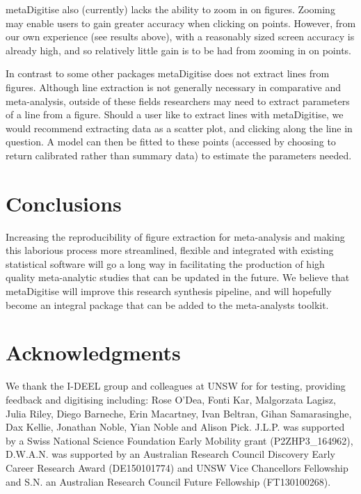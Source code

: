 \documentclass[12pt]{article}
\newcommand{\pkg}[1]{{\fontseries{b}\selectfont #1}}
\begin{document}
\pkg{metaDigitise} also (currently) lacks the ability to zoom in on figures. Zooming may enable users to gain greater accuracy when clicking on points. However, from our own experience (see results above), with a reasonably sized screen accuracy is already high, and so relatively little gain is to be had from zooming in on points.

In contrast to some other packages \pkg{metaDigitise} does not extract lines from figures. Although line extraction is not generally necessary in comparative and meta-analysis, outside of these fields researchers may need to extract parameters of a line from a figure. Should a user like to extract lines with \pkg{metaDigitise}, we would recommend extracting data as a scatter plot, and clicking along the line in question. A model can then be fitted to these points (accessed by choosing to return calibrated rather than summary data) to estimate the parameters needed.





\section{Conclusions}
Increasing the reproducibility of figure extraction for meta-analysis and making this laborious process more streamlined, flexible and integrated with existing statistical software will go a long way in facilitating the production of high quality meta-analytic studies that can be updated in the future. We believe that \pkg{metaDigitise} will improve this research synthesis pipeline, and will hopefully become an integral package that can be added to the meta-analysts toolkit.

\section*{Acknowledgments}
We thank the I-DEEL group and colleagues at UNSW for for testing, providing feedback and digitising including: Rose O'Dea, Fonti Kar, Malgorzata Lagisz, Julia Riley, Diego Barneche, Erin Macartney, Ivan Beltran, Gihan Samarasinghe, Dax Kellie, Jonathan Noble, Yian Noble and Alison Pick. J.L.P. was supported by a Swiss National Science Foundation Early Mobility grant (P2ZHP3\_164962), D.W.A.N. was supported by an Australian Research Council Discovery Early Career Research Award (DE150101774) and UNSW Vice Chancellors Fellowship and S.N. an Australian Research Council Future Fellowship (FT130100268). 
\end{document}
